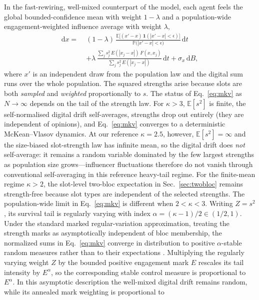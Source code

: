 \documentclass[5p,times,twocolumn]{elsarticle}
\newcommand{\dd}{\mathrm{d}}
\begin{document}
In the fast-rewiring, well-mixed counterpart of the model, each agent
feels the global bounded-confidence mean with weight $1 - \lambda$ and a
population-wide engagement-weighted influence average with weight
$\lambda$,
\begin{align}
  \dd x =\;&
  (1-\lambda)\,
  \frac{\mathbb{E}\big[(x' - x)\,\mathbf 1(|x'-x|<\epsilon)\big]}
       {\mathbb{P}\big(|x'-x|<\epsilon\big)}\, \dd t
  \nonumber\\
  &+ \lambda\,
  \frac{\sum_j s_j^{2}\,E(|x_j-x|)\, F(x, x_j)}
       {\sum_j s_j^{2}\,E(|x_j-x|)}\, \dd t
  + \sigma_x\, \dd B,
  \label{eq:mkv}
\end{align}
where $x'$ is an independent draw from the population law and the digital
sum runs over the whole population. The squared strengths arise because
slots are both \emph{sampled} and \emph{weighted} proportionally to $s$.
The status of Eq.~\eqref{eq:mkv} as $N \to \infty$ depends on the tail of
the strength law. For $\kappa > 3$, $\mathbb{E}[s^2]$ is finite, the
self-normalised digital drift self-averages, strengths drop out entirely
(they are independent of opinions), and Eq.~\eqref{eq:mkv} converges to a
deterministic McKean--Vlasov dynamics. At our reference $\kappa = 2.5$,
however, $\mathbb{E}[s^2] = \infty$ and the size-biased slot-strength law
has infinite mean, so the digital drift does \emph{not} self-average: it
remains a random variable dominated by the few largest strengths as
population size grows---influencer fluctuations therefore do not vanish
through conventional self-averaging in this reference heavy-tail regime. For the finite-mean regime $\kappa>2$, the slot-level two-bloc
expectation in Sec.~\ref{sec:twobloc} remains strength-free because slot
types are independent of the selected strengths. The population-wide
limit in Eq.~\eqref{eq:mkv} is different when $2<\kappa<3$. Writing
$Z=s^2$, its survival tail is regularly varying with index
$\alpha=(\kappa-1)/2\in(1/2,1)$. Under the standard marked
regular-variation approximation, treating the strength marks as
asymptotically independent of bloc membership, the normalized sums in
Eq.~\eqref{eq:mkv} converge in distribution to positive
$\alpha$-stable random measures rather than to their expectations
\citep{resnick2007}. Multiplying the regularly varying weight $Z$ by the
bounded positive engagement mark $E$ rescales its tail intensity by
$E^{\alpha}$, so the corresponding stable control measure is proportional
to $E^{\alpha}$. In this asymptotic description the well-mixed digital
drift remains random, while its annealed mark weighting is proportional to
\end{document}
